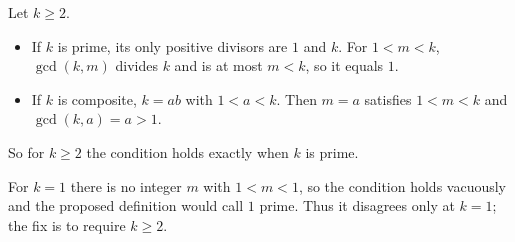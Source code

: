 Let $k\ge2$.
\begin{itemize}
\item If $k$ is prime, its only positive divisors are $1$ and $k$. For $1<m<k$, $\gcd(k,m)$ divides $k$ and is at most $m<k$, so it equals $1$.
\item If $k$ is composite, $k=ab$ with $1<a<k$. Then $m=a$ satisfies $1<m<k$ and $\gcd(k,a)=a>1$.
\end{itemize}
So for $k\ge2$ the condition holds exactly when $k$ is prime.

For $k=1$ there is no integer $m$ with $1<m<1$, so the condition holds vacuously and the proposed definition would call $1$ prime. Thus it disagrees only at $\boxed{k=1}$; the fix is to require $k\ge2$.
